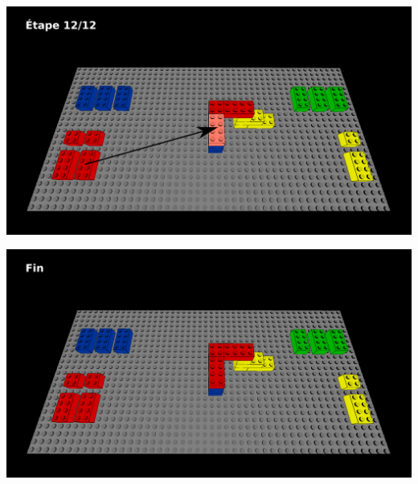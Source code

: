 \documentclass[aspectratio=169]{beamer}
\begin{document}
\begin{frame}
  \includegraphics[width=\linewidth]{step12.png}
\end{frame}

\begin{frame}
  \includegraphics[width=\linewidth]{end.png}
\end{frame}
\end{document}

